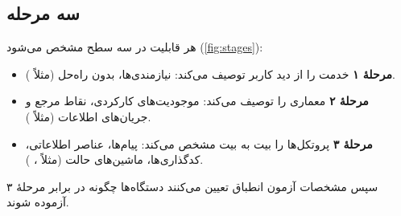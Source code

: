 \documentclass[11pt,a4paper]{article}
\begin{document}
\subsection{سه مرحله}
هر قابلیت در سه سطح مشخص می‌شود (\cref{fig:stages}):
\begin{itemize}
  \item \textbf{مرحلهٔ ۱} خدمت را از دید کاربر توصیف می‌کند: نیازمندی‌ها، بدون راه‌حل (مثلاً  \cite{ts22261}).
  \item \textbf{مرحلهٔ ۲} معماری را توصیف می‌کند: موجودیت‌های کارکردی، نقاط مرجع و جریان‌های اطلاعات (مثلاً 
        \cite{ts23501}).
  \item \textbf{مرحلهٔ ۳} پروتکل‌ها را بیت به بیت مشخص می‌کند: پیام‌ها، عناصر اطلاعاتی، کدگذاری‌ها، ماشین‌های حالت (مثلاً
         \cite{ts24501}،  \cite{ts38331}).
\end{itemize}
سپس مشخصات آزمون انطباق تعیین می‌کنند دستگاه‌ها چگونه در برابر مرحلهٔ ۳ آزموده شوند.

\begin{acnfigure}
  \caption{روش سه‌مرحله‌ای با مشخصات نمونه.}
  \label{fig:stages}
\end{acnfigure}
\end{document}
